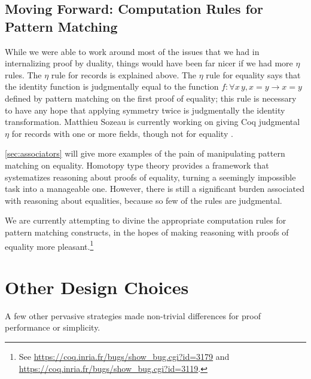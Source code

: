 \documentclass[runningheads]{llncs}
\begin{document}
  \subsection{Moving Forward: Computation Rules for Pattern Matching} \label{sec:compute-match}
    While we were able to work around most of the issues that we had in internalizing proof by duality, things would have been far nicer if we had more $\eta$ rules.  The $\eta$ rule for records is explained above.  The $\eta$ rule for equality says that the identity function is judgmentally equal to the function $f : \forall x\, y, x = y \to x = y$ defined by pattern matching on the first proof of equality; this rule is necessary to have any hope that applying symmetry twice is judgmentally the identity transformation.  Matthieu Sozeau is currently working on giving Coq judgmental $\eta$ for records with one or more fields, though not for equality%
    .

    \autoref{sec:associators} will give more examples of the pain of manipulating pattern matching on equality.  Homotopy type theory provides a framework that systematizes reasoning about proofs of equality, turning a seemingly impossible task into a manageable one.  However, there is still a significant burden associated with reasoning about equalities, because so few of the rules are judgmental.

    We are currently attempting to divine the appropriate computation rules for pattern matching constructs, in the hopes of making reasoning with proofs of equality more pleasant.\footnote{See \url{https://coq.inria.fr/bugs/show\_bug.cgi?id=3179} and \url{https://coq.inria.fr/bugs/show\_bug.cgi?id=3119}.}

\section{Other Design Choices}\label{sec:other}

A few other pervasive strategies made non-trivial differences for proof performance or simplicity.
\end{document}
